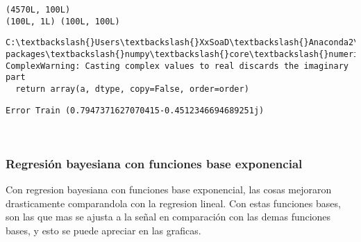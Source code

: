 \documentclass[11pt]{article}
\begin{document}
    \begin{Verbatim}[commandchars=\\\{\}]
(4570L, 100L)
(100L, 1L) (100L, 100L)

    \end{Verbatim}

    \begin{Verbatim}[commandchars=\\\{\}]
C:\textbackslash{}Users\textbackslash{}XxSoaD\textbackslash{}Anaconda2\textbackslash{}lib\textbackslash{}site-packages\textbackslash{}numpy\textbackslash{}core\textbackslash{}numeric.py:492: ComplexWarning: Casting complex values to real discards the imaginary part
  return array(a, dtype, copy=False, order=order)

    \end{Verbatim}

    \begin{Verbatim}[commandchars=\\\{\}]
Error Train (0.7947371627070415-0.4512346694689251j)

    \end{Verbatim}

    \begin{center}
    \end{center}
    { \hspace*{\fill} \\}
    
    \subsubsection{Regresión bayesiana con funciones base
exponencial}\label{regresiuxf3n-bayesiana-con-funciones-base-exponencial}

    Con regresion bayesiana con funciones base exponencial, las cosas
mejoraron drasticamente comparandola con la regresion lineal. Con estas
funciones bases, son las que mas se ajusta a la señal en comparación con
las demas funciones bases, y esto se puede apreciar en las graficas.
\end{document}
